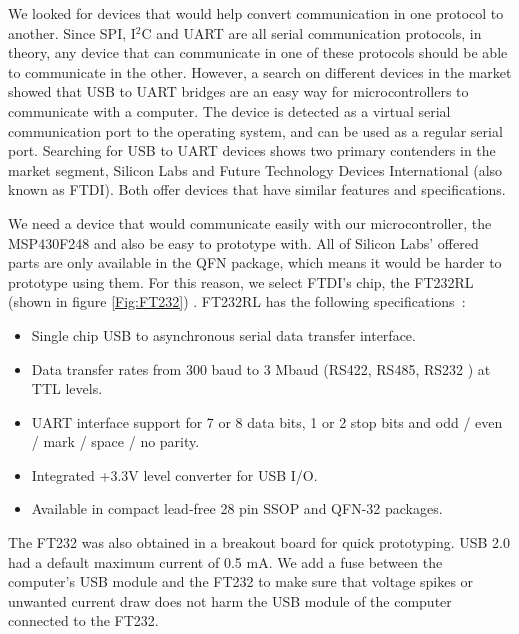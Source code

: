 We looked for devices that would help convert communication in one protocol to another. Since SPI, I$^2$C and UART are all serial communication protocols, in theory, any device that can communicate in one of these protocols should be able to communicate in the other. However, a search on different devices in the market showed that USB to UART bridges are an easy way for microcontrollers to communicate with a computer. The device is detected as a virtual serial communication port to the operating system, and can be used as a regular serial port. Searching for USB to UART devices shows two primary contenders in the market segment, Silicon Labs and Future Technology Devices International (also known as FTDI). Both offer devices that have similar features and specifications. 

We need a device that would communicate easily with our microcontroller, the MSP430F248 and also be easy to prototype with. All of Silicon Labs' offered parts are only available in the QFN package, which means it would be harder to prototype using them. For this reason, we select FTDI's chip, the FT232RL (shown in figure \ref{Fig:FT232}) \cite{Web:FTIMG}. FT232RL has the following specifications~\cite{FT232Datasheet}:

\begin{itemize}
	\item Single chip USB to asynchronous serial data transfer interface.
	\item Data transfer rates from 300 baud to 3 Mbaud (RS422, RS485, RS232 ) at TTL levels.
	\item UART interface support for 7 or 8 data bits, 1 or 2 stop bits and odd / even / mark / space / no parity.
	\item Integrated +3.3V level converter for USB I/O.
	\item Available in compact lead-free 28 pin SSOP and QFN-32 packages.
\end{itemize}

The FT232 was also obtained in a breakout board for quick prototyping.
USB 2.0 had a default maximum current of 0.5 mA. We add a fuse between the computer's USB module and the FT232 to make sure that voltage spikes or unwanted current draw does not harm the USB module of the computer connected to the FT232.


